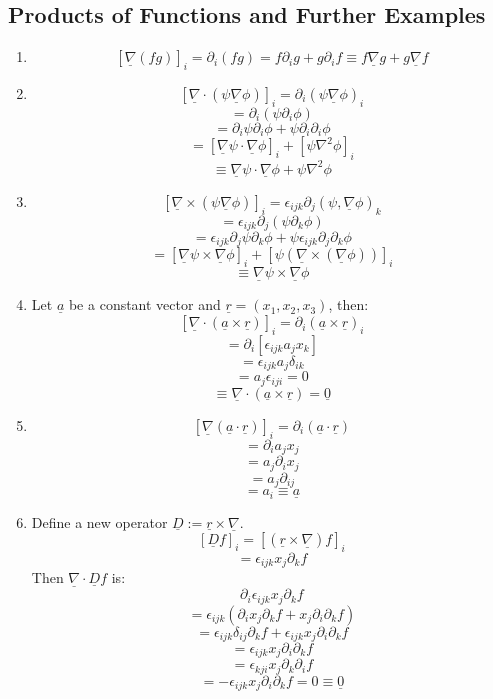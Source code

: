 \documentclass[12pt]{article}
\newcommand{\dive}[1]{\underline{\nabla}\cdot\underline{#1}}
\newcommand{\grad}[1]{\underline{\nabla}#1}
\begin{document}
\subsection{Products of Functions and Further Examples}
\begin{enumerate}
    \item 
    \[[\underline{\nabla}(fg)]_i=\partial_i(fg)=f\partial_ig+g\partial_if\equiv f\grad{g}+g\grad{f}\]
    \item
    \[[\underline{\nabla}\cdot(\psi\grad{\phi})]_i=\partial_i(\psi\grad{\phi})_i\]
    \[=\partial_i(\psi\partial_i\phi)\]
    \[=\partial_i\psi\partial_i\phi+\psi\partial_i\partial_i\phi\]
    \[=[\grad{\psi}\cdot\grad{\phi}]_i+[\psi\nabla^2\phi]_i\]
    \[\equiv\grad{\psi}\cdot\grad{\phi}+\psi\nabla^2\phi\]
    \item
    \[[\underline{\nabla}\times(\psi\grad{\phi})]_i=\epsilon_{ijk}\partial_j(\psi,\grad{\phi})_k\]
    \[=\epsilon_{ijk}\partial_j(\psi\partial_k\phi)\]
    \[=\epsilon_{ijk}\partial_j\psi\partial_k\phi+\psi\epsilon_{ijk}\partial_j\partial_k\phi\]
    \[=[\grad{\psi}\times\grad{\phi}]_i+[\psi(\underline{\nabla}\times(\grad{\phi}))]_i\]
    \[\equiv\grad{\psi}\times\grad{\phi}\]
    \item Let \(\underline{a}\) be a constant vector and \(\underline{r}=(x_1,x_2,x_3)\), then:
    \[[\underline{\nabla}\cdot(\underline{a}\times\underline{r})]_i=\partial_i(\underline{a}\times\underline{r})_i\]
    \[=\partial_i[\epsilon_{ijk}a_jx_k]\]
    \[=\epsilon_{ijk}a_j\delta_{ik}\]
    \[=a_j\epsilon_{iji}=0\]
    \[\equiv\underline{\nabla}\cdot(\underline{a}\times\underline{r})=\underline{0}\]
    \item 
    \[[\underline{\nabla}(\underline{a}\cdot\underline{r})]_i=\partial_i(\underline{a}\cdot\underline{r})\]
    \[=\partial_ia_jx_j\]
    \[=a_j\partial_ix_j\]
    \[=a_j\partial_{ij}\]
    \[=a_i\equiv \underline{a}\]
    \item Define a new operator \(\underline{D}:=\underline{r}\times\underline{\nabla}\).
    \[[\underline{D}f]_i=[(\underline{r}\times\underline{\nabla})f]_i\]
    \[=\epsilon_{ijk}x_j\partial_kf\]
    Then \(\dive{D}f\) is:
    \[\partial_i\epsilon_{ijk}x_j\partial_kf\]
    \[=\epsilon_{ijk}(\partial_{i}x_j\partial_kf+x_j\partial_i\partial_kf)\]
    \[=\epsilon_{ijk}\delta_{ij}\partial_kf+\epsilon_{ijk}x_j\partial_i\partial_kf\]
    \[=\epsilon_{ijk}x_j\partial_i\partial_kf\]
    \[=\epsilon_{kji}x_j\partial_k\partial_if\]
    \[=-\epsilon_{ijk}x_j\partial_i\partial_kf=0\equiv\underline{0}\]
\end{enumerate}
\end{document}

